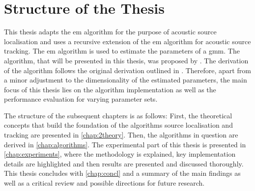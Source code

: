 \section{Structure of the Thesis}
\label{chap:1structure}

This thesis adapts the \gls{em} algorithm for the purpose of acoustic source localisation and uses a recursive extension of the \gls{em} algorithm for acoustic source tracking. The \gls{em} algorithm is used to estimate the parameters of a \gls{gmm}. The algorithm, that will be presented in this thesis, was proposed by \citeauthor{Schwartz2014} \cite{Schwartz2014}. The derivation of the algorithm follows the original derivation outlined in \cite{Schwartz2014}. Therefore, apart from a minor adjustment to the dimensionality of the estimated parameters, the main focus of this thesis lies on the algorithm implementation as well as the performance evaluation for varying parameter sets.

The structure of the subsequent chapters is as follows: First, the theoretical concepts that build the foundation of the algorithms source localisation and tracking are presented in \autoref{chap:2theory}. Then, the algorithms in question are derived in \autoref{chap:algorithms}. The experimental part of this thesis is presented in \autoref{chap:experiments}, where the methodology is explained, key implementation details are highlighted and then results are presented and discussed thoroughly. This thesis concludes with \autoref{chap:concl} and a summary of the main findings as well as a critical review and possible directions for future research.



